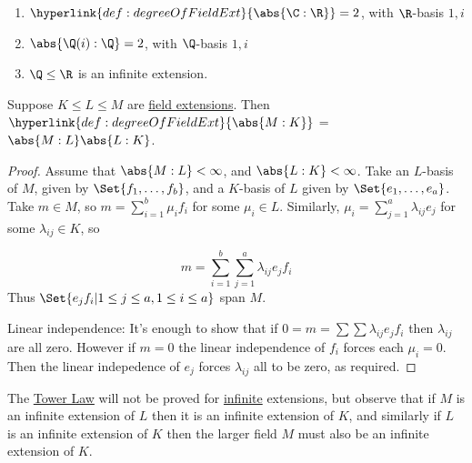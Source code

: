 \documentclass{article}
\begin{document}
\begin{eg}\leavevmode
    \begin{enumerate}[label=(\roman*)]
        \item $\hyperlink{def:degreeOfFieldExt}{\abs{\C:\R}} = 2$, with $\R$-basis $1, i$
        \item $\abs{\Q(i):\Q} = 2$, with $\Q$-basis $1, i$
        \item $\Q \leq \R$ is an infinite extension.
    \end{enumerate}
\end{eg}

\begin{nthm}\label{thm:towerLaw}
    Suppose $K \leq L \leq M$ are \hyperlink{def:fieldExt}{field extensions}. Then $\hyperlink{def:degreeOfFieldExt}{\abs{M:K}}$ = $\abs{M:L}\abs{L:K}$.
\end{nthm}

\begin{proof}
    Assume that $\abs{M:L} < \infty$, and $\abs{L:K} < \infty$.
    Take an $L$-basis of $M$, given by $\Set{f_1, \dotsc, f_b}$, and a $K$-basis of $L$ given by $\Set{e_1, \dotsc, e_a}$.
    Take $m \in M$, so $m = \sum_{i=1}^b \mu_i f_i$ for some $\mu_i \in L$.
    Similarly, $\mu_i = \sum_{j=1}^a \lambda_{ij} e_j$ for some $\lambda_{ij} \in K$, so

    \begin{equation*}
        m = \sum_{i=1}^b \sum_{j=1}^a \lambda_{ij} e_j f_i
    \end{equation*}
    Thus $\Set{e_j f_i | 1 \leq j \leq a, 1 \leq i \leq a}$ span $M$.

    Linear independence:
    It's enough to show that if $0 = m = \sum \sum \lambda_{ij} e_j f_i$ then $\lambda_{ij}$ are all zero.
    However if $m = 0$ the linear independence of $f_i$ forces each $\mu_i = 0$.
    Then the linear indepedence of $e_j$ forces $\lambda_{ij}$ all to be zero, as required.
\end{proof}

The \hyperlink{def:towerLaw}{Tower Law} will not be proved for \hyperlink{def:degreeOfFieldExt}{infinite} extensions, but observe that if $M$ is an infinite extension of $L$ then it is an infinite extension of $K$, and similarly if $L$ is an infinite extension of $K$ then the larger field $M$ must also be an infinite extension of $K$.
\end{document}

